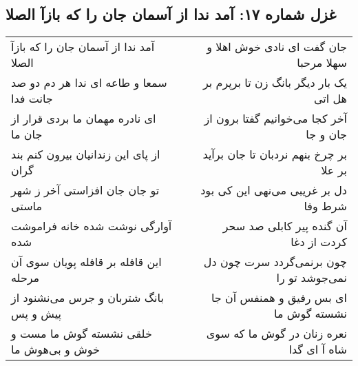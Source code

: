 \begin{center}
\section*{غزل شماره ۱۷: آمد ندا از آسمان جان را که بازآ الصلا}
\label{sec:0017}
\begin{longtable}{l p{0.5cm} r}
آمد ندا از آسمان جان را که بازآ الصلا
&&
جان گفت ای نادی خوش اهلا و سهلا مرحبا
\\
سمعا و طاعه ای ندا هر دم دو صد جانت فدا
&&
یک بار دیگر بانگ زن تا برپرم بر هل اتی
\\
ای نادره مهمان ما بردی قرار از جان ما
&&
آخر کجا می‌خوانیم گفتا برون از جان و جا
\\
از پای این زندانیان بیرون کنم بند گران
&&
بر چرخ بنهم نردبان تا جان برآید بر علا
\\
تو جان جان افزاستی آخر ز شهر ماستی
&&
دل بر غریبی می‌نهی این کی بود شرط وفا
\\
آوارگی نوشت شده خانه فراموشت شده
&&
آن گنده پیر کابلی صد سحر کردت از دغا
\\
این قافله بر قافله پویان سوی آن مرحله
&&
چون برنمی‌گردد سرت چون دل نمی‌جوشد تو را
\\
بانگ شتربان و جرس می‌نشنود از پیش و پس
&&
ای بس رفیق و همنفس آن جا نشسته گوش ما
\\
خلقی نشسته گوش ما مست و خوش و بی‌هوش ما
&&
نعره زنان در گوش ما که سوی شاه آ ای گدا
\\
\end{longtable}
\end{center}
